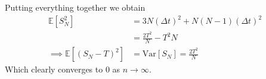 \documentclass[a4paper,12pt]{article} %
\newcommand{\Var}{\mathrm{Var}}
\begin{document}
Putting everything together we obtain
\begin{align*}
    \mathbb{E} \left[ S_N^2 \right]                             & = 3N (\Delta t)^{2} +N(N-1)(\Delta t)^{2} \\
                                                                & = \frac{2T^2}{N}-T^2{N}                   \\
    \implies \mathbb{E} \left[ \left( S_N  -T\right)^2  \right] & = \Var\left[S_N  \right] = \frac{2T^2}{N}
\end{align*}
Which clearly converges to \(0\) as \(n\to  \infty \).
\end{document}
